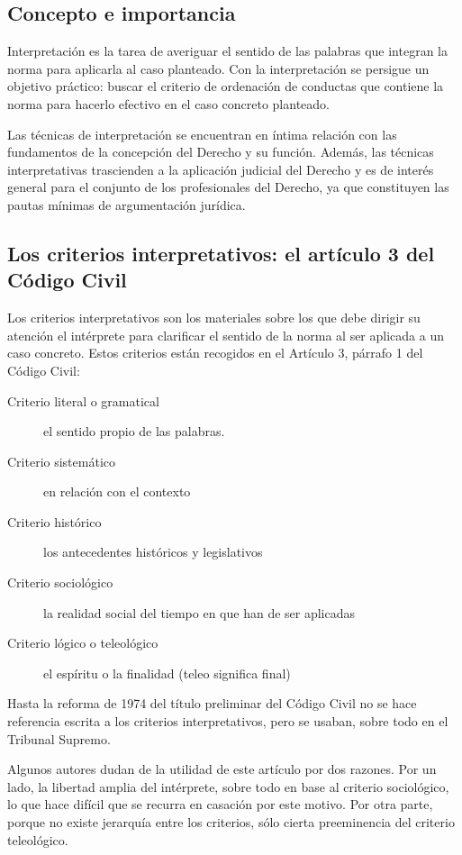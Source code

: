 \documentclass[a4paper,12pt]{report}
\begin{document}
\subsection{Concepto e importancia}

Interpretación es la tarea de averiguar el sentido de las palabras que integran la norma para aplicarla al caso planteado. Con la interpretación se persigue un objetivo práctico: buscar el criterio de ordenación de conductas que contiene la norma para hacerlo efectivo en el caso concreto planteado.

Las técnicas de interpretación se encuentran en íntima relación con las fundamentos de la concepción del Derecho y su función. Además, las técnicas interpretativas trascienden a la aplicación judicial del Derecho y es de interés general para el conjunto de los profesionales del Derecho, ya que constituyen las pautas mínimas de argumentación jurídica.

\subsection{Los criterios interpretativos: el artículo 3 del Código Civil}

Los criterios interpretativos son los materiales sobre los que debe dirigir su atención el intérprete para clarificar el sentido de la norma al ser aplicada a un caso concreto. Estos criterios están recogidos en el Artículo 3, párrafo 1 del Código Civil:

\begin{description}
\item[Criterio literal o gramatical] el sentido propio de las palabras.
\item[Criterio sistemático] en relación con el contexto
\item[Criterio histórico] los antecedentes históricos y legislativos
\item[Criterio sociológico] la realidad social del tiempo en que han de ser aplicadas
\item[Criterio lógico o teleológico] el espíritu o la finalidad (teleo significa final)
\end{description}

Hasta la reforma de 1974 del título preliminar del Código Civil no se hace referencia escrita a los criterios interpretativos, pero se usaban, sobre todo en el Tribunal Supremo.

Algunos autores dudan de la utilidad de este artículo por dos razones. Por un lado, la libertad amplia del intérprete, sobre todo en base al criterio sociológico, lo que hace difícil que se recurra en casación por este motivo. Por otra parte, porque no existe jerarquía entre los criterios, sólo cierta preeminencia del criterio teleológico.
\end{document}
